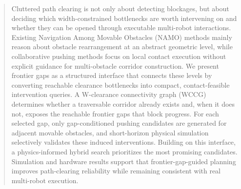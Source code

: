 \begin{abstract}
Cluttered path clearing is not only about detecting blockages, but about deciding which width-constrained bottlenecks are worth intervening on and whether they can be opened through executable multi-robot interactions. Existing Navigation Among Movable Obstacles (NAMO) methods mainly reason about obstacle rearrangement at an abstract geometric level, while collaborative pushing methods focus on local contact execution without explicit guidance for multi-obstacle corridor construction. We present frontier gaps as a structured interface that connects these levels by converting reachable clearance bottlenecks into compact, contact-feasible intervention queries. A W-clearance connectivity graph (WCCG) determines whether a traversable corridor already exists and, when it does not, exposes the reachable frontier gaps that block progress. For each selected gap, only gap-conditioned pushing candidates are generated for adjacent movable obstacles, and short-horizon physical simulation selectively validates these induced interventions. Building on this interface, a physics-informed hybrid search prioritizes the most promising candidates. Simulation and hardware results support that frontier-gap-guided planning improves path-clearing reliability while remaining consistent with real multi-robot execution.
\end{abstract}